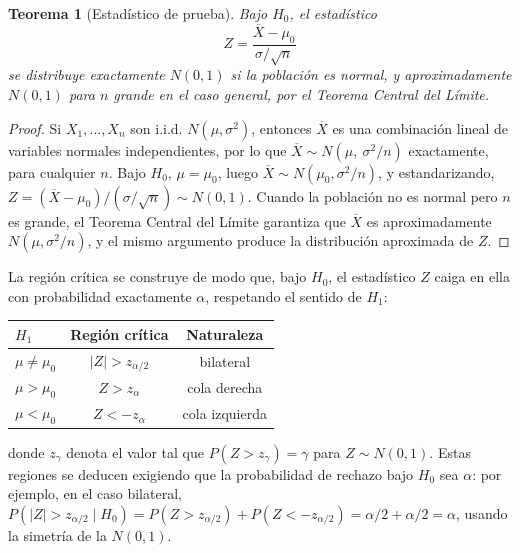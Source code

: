 \documentclass[11pt,a4paper]{article}
\theoremstyle{plain}
\newtheorem{teorema}{Teorema}[section]
\theoremstyle{definition}
\theoremstyle{remark}
\begin{document}
\begin{teorema}[Estadístico de prueba]
Bajo $H_0$, el estadístico
\[
Z=\frac{\overline X-\mu_0}{\sigma/\sqrt n}
\]
se distribuye exactamente $N(0,1)$ si la población es normal, y aproximadamente $N(0,1)$ para $n$ grande en el caso general, por el Teorema Central del Límite.
\end{teorema}

\begin{proof}
Si $X_1,\dots,X_n$ son i.i.d. $N(\mu,\sigma^2)$, entonces $\overline X$ es una combinación lineal de variables normales independientes, por lo que $\overline X\sim N\!\left(\mu,\ \sigma^2/n\right)$ exactamente, para cualquier $n$. Bajo $H_0$, $\mu=\mu_0$, luego $\overline X\sim N(\mu_0,\sigma^2/n)$, y estandarizando, $Z=(\overline X-\mu_0)/(\sigma/\sqrt n)\sim N(0,1)$. Cuando la población no es normal pero $n$ es grande, el Teorema Central del Límite garantiza que $\overline X$ es aproximadamente $N(\mu,\sigma^2/n)$, y el mismo argumento produce la distribución aproximada de $Z$.
\end{proof}

La región crítica se construye de modo que, bajo $H_0$, el estadístico $Z$ caiga en ella con probabilidad exactamente $\alpha$, respetando el sentido de $H_1$:

\begin{table}[h]
\centering
\small
\begin{tabular}{@{}lcc@{}}
\toprule
$H_1$ & Región crítica & Naturaleza \\
\midrule
$\mu\neq\mu_0$ & $|Z|>z_{\alpha/2}$ & bilateral \\
$\mu>\mu_0$ & $Z>z_{\alpha}$ & cola derecha \\
$\mu<\mu_0$ & $Z<-z_{\alpha}$ & cola izquierda \\
\bottomrule
\end{tabular}
\end{table}

\noindent donde $z_\gamma$ denota el valor tal que $P(Z>z_\gamma)=\gamma$ para $Z\sim N(0,1)$. Estas regiones se deducen exigiendo que la probabilidad de rechazo bajo $H_0$ sea $\alpha$: por ejemplo, en el caso bilateral, $P(|Z|>z_{\alpha/2}\mid H_0)=P(Z>z_{\alpha/2})+P(Z<-z_{\alpha/2})=\alpha/2+\alpha/2=\alpha$, usando la simetría de la $N(0,1)$.
\end{document}
